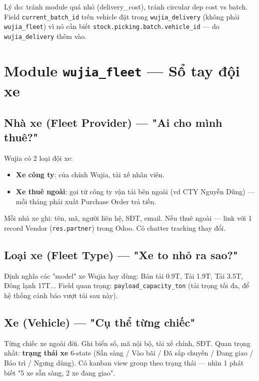 Lý do: tránh module quá nhỏ (delivery\_cost), tránh circular dep cost vs batch. Field \texttt{current\_batch\_id} trên vehicle đặt trong \texttt{wujia\_delivery} (không phải \texttt{wujia\_fleet}) vì nó cần biết \texttt{stock.picking.batch.vehicle\_id} --- do \texttt{wujia\_delivery} thêm vào.

\section{Module \texttt{wujia\_fleet} --- Sổ tay đội xe}

\subsection{Nhà xe (Fleet Provider) --- "Ai cho mình thuê?"}

Wujia có 2 loại đội xe:

\begin{itemize}
    \item \textbf{Xe công ty}: của chính Wujia, tài xế nhân viên.
    \item \textbf{Xe thuê ngoài}: gọi từ công ty vận tải bên ngoài (vd CTY Nguyễn Dũng) --- mỗi tháng phải xuất Purchase Order trả tiền.
\end{itemize}

Mỗi nhà xe ghi: tên, mã, người liên hệ, SĐT, email. Nếu thuê ngoài --- link với 1 record Vendor (\texttt{res.partner}) trong Odoo. Có chatter tracking thay đổi.

\subsection{Loại xe (Fleet Type) --- "Xe to nhỏ ra sao?"}

Định nghĩa các "model" xe Wujia hay dùng: Bán tải 0.9T, Tải 1.9T, Tải 3.5T, Đông lạnh 17T... Field quan trọng: \texttt{payload\_capacity\_ton} (tải trọng tối đa, để hệ thống cảnh báo vượt tải sau này).

\subsection{Xe (Vehicle) --- "Cụ thể từng chiếc"}

Từng chiếc xe ngoài đời. Ghi biển số, mã nội bộ, tài xế chính, SĐT. Quan trọng nhất: \textbf{trạng thái xe} 6-state (Sẵn sàng / Vào bãi / Đã sắp chuyến / Đang giao / Bảo trì / Ngưng dùng). Có kanban view group theo trạng thái --- nhìn 1 phát biết "5 xe sẵn sàng, 2 xe đang giao".

